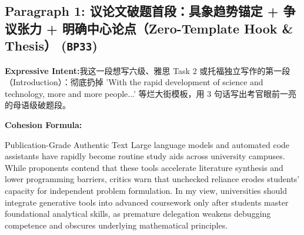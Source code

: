 \subsection*{Paragraph 1: 议论文破题首段：具象趋势锚定 + 争议张力 + 明确中心论点（Zero-Template Hook \& Thesis） (\texttt{BP33})}
\noindent\textbf{Expressive Intent:}\enspace 我这一段想写六级、雅思 Task 2 或托福独立写作的第一段（Introduction）：彻底扔掉 'With the rapid development of science and technology, more and more people...' 等烂大街模板，用 3 句话写出考官眼前一亮的母语级破题段。\par
\noindent\textbf{Cohesion Formula:}\par\vspace{4pt}
\begin{ExampleBox}{Publication-Grade Authentic Text}
Large language models and automated code assistants have rapidly become routine study aids across university campuses. While proponents contend that these tools accelerate literature synthesis and lower programming barriers, critics warn that unchecked reliance erodes students' capacity for independent problem formulation. In my view, universities should integrate generative tools into advanced coursework only after students master foundational analytical skills, as premature delegation weakens debugging competence and obscures underlying mathematical principles.
\end{ExampleBox}
